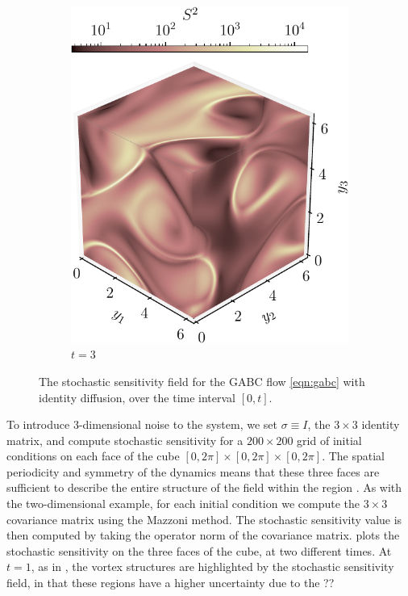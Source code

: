 \begin{figure}
\begin{subfigure}[t]{0.49\textwidth}
		\includegraphics[width=\textwidth]{chp04_paper_numerics/figures/gabc/S2_box_3.0_cropped}
		\caption{\(t = 3\)}
		\label{fig:gabc_S2_3}
	\end{subfigure}
	\caption{The stochastic sensitivity field for the GABC flow \cref{eqn:gabc} with identity diffusion, over the time interval \([0,t]\).}%
	\label{fig:gabc_S2}
\end{figure}

To introduce 3-dimensional noise to the system, we set \(\sigma \equiv I\), the \(3 \times 3\) identity matrix, and compute stochastic sensitivity for a \(200\times 200\) grid of initial conditions on each face of the cube \([0,2\pi] \times [0,2\pi] \times [0,2\pi]\).
The spatial periodicity and symmetry of the dynamics means that these three faces are sufficient to describe the entire structure of the field within the region \citep{DombreEtAl_1986_ChaoticStreamlinesABC}.
As with the two-dimensional example, for each initial condition we compute the \(3\times 3\) covariance matrix using the Mazzoni method.
The stochastic sensitivity value is then computed by taking the operator norm of the covariance matrix.
 plots the stochastic sensitivity on the three faces of the cube, at two different times.
At \(t = 1\), as in , the vortex structures are highlighted by the stochastic sensitivity field, in that these regions have a higher uncertainty due to the ??
